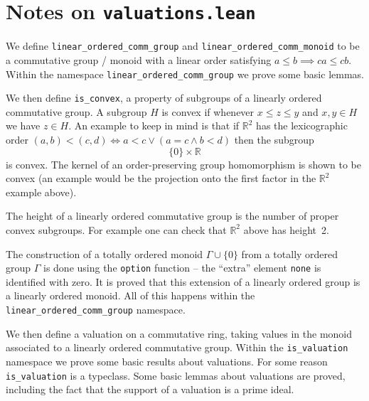 \documentclass{amsart}
\theoremstyle{plain}
\theoremstyle{remark}
\begin{document}
\section{Notes on {\tt valuations.lean}}

We define {\tt linear\_ordered\_comm\_group} and {\tt linear\_ordered\_comm\_monoid} to be a commutative group / monoid with a linear order satisfying $a\leq b\implies ca \leq cb$. Within the namespace {\tt linear\_ordered\_comm\_group} we prove some basic lemmas.

We then define {\tt is\_convex}, a property of subgroups of a linearly ordered commutative group. A subgroup $H$ is convex if whenever $x\leq z\leq y$ and $x,y\in H$ we have $z\in H$. An example to keep in mind is that if $\mathbb{R}^2$ has the lexicographic order $(a,b)< (c,d)\iff a<c \lor (a=c \land b<d)$ then the subgroup $$\{0\}\times\mathbb{R}$$ is convex. The kernel of an order-preserving group homomorphism is shown to be convex (an example would be the projection onto the first factor in the $\mathbb{R}^2$ example above).

The height of a linearly ordered commutative group is the number of proper convex subgroups. For example one can check that $\mathbb{R}^2$ above has height~2.

The construction of a totally ordered monoid $\Gamma\cup\{0\}$ from a totally ordered group $\Gamma$ is done using the {\tt option} function -- the ``extra'' element {\tt none} is identified with zero. It is proved that this extension of a linearly ordered group is a linearly ordered monoid. All of this happens within the {\tt linear\_ordered\_comm\_group} namespace.

We then define a valuation on a commutative ring, taking values in the monoid associated to a linearly ordered commutative group. Within the {\tt is\_valuation} namespace we prove some basic results about valuations. For some reason {\tt is\_valuation} is a typeclass. Some basic lemmas about valuations are proved, including the fact that the support of a valuation is a prime ideal.
\end{document}
